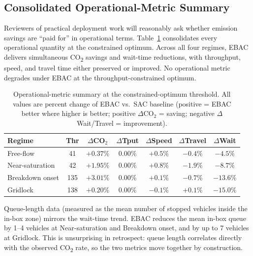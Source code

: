 \documentclass[review,3p,authoryear,times]{elsarticle}
\begin{document}
\subsection{Consolidated Operational-Metric Summary}
\label{sec:opmetrics}

Reviewers of practical deployment work will reasonably ask whether emission
savings are ``paid for'' in operational terms. Table~\ref{tab:opmetrics}
consolidates every operational quantity at the constrained optimum. Across
all four regimes, EBAC delivers simultaneous CO\textsubscript{2} savings and
wait-time reductions, with throughput, speed, and travel time either
preserved or improved. No operational metric degrades under EBAC at the
throughput-constrained optimum.

\begin{table}[H]
  \centering
  \caption{Operational-metric summary at the constrained-optimum threshold.
    All values are percent change of EBAC vs.\ SAC baseline (positive = EBAC
    better where higher is better; positive $\Delta$CO$_2$ = saving; negative
    $\Delta$Wait/Travel = improvement).}
  \label{tab:opmetrics}
  \small
  \begin{tabularx}{\textwidth}{lcccccc}
    \toprule
    \textbf{Regime} & \textbf{Thr} & \textbf{$\Delta$CO$_2$} &
    \textbf{$\Delta$Tput} & \textbf{$\Delta$Speed} & \textbf{$\Delta$Travel} &
    \textbf{$\Delta$Wait} \\
    \midrule
    Free-flow       & 41  & $+0.37\%$ & $0.00\%$ & $+0.5\%$ & $-0.4\%$ & $-4.5\%$ \\
    Near-saturation & 42  & $+1.95\%$ & $0.00\%$ & $+0.8\%$ & $-1.9\%$ & $-8.7\%$ \\
    Breakdown onset & 135 & $+3.01\%$ & $0.00\%$ & $+0.1\%$ & $-0.7\%$ & $-13.6\%$ \\
    Gridlock        & 138 & $+0.20\%$ & $0.00\%$ & $-0.1\%$ & $+0.1\%$ & $-15.0\%$ \\
    \bottomrule
  \end{tabularx}
\end{table}

Queue-length data (measured as the mean number of stopped vehicles inside
the in-box zone) mirrors the wait-time trend. EBAC reduces the mean in-box
queue by 1--4 vehicles at Near-saturation and Breakdown onset, and by up to
7 vehicles at Gridlock. This is unsurprising in retrospect: queue length
correlates directly with the observed CO\textsubscript{2} rate, so the two
metrics move together by construction.
\end{document}
